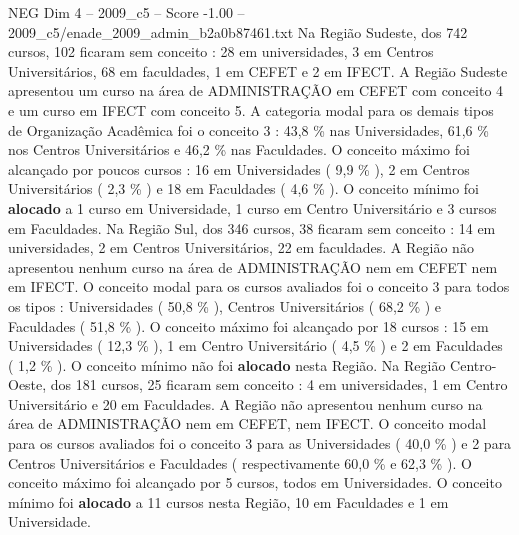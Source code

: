 \begin{textsample}{NEG Dim 4 – 2009\_c5 – Score -1.00 – 2009\_c5/enade\_2009\_admin\_b2a0b87461.txt}
Na Região Sudeste, dos 742 cursos, 102 ficaram sem conceito : 28 em universidades, 3 em Centros Universitários, 68 em faculdades, 1 em CEFET e 2 em IFECT.
A Região Sudeste apresentou um curso na área de ADMINISTRAÇÃO em CEFET com conceito 4 e um curso em IFECT com conceito 5.
A categoria modal para os demais tipos de Organização Acadêmica foi o conceito 3 : 43,8 \% nas Universidades, 61,6 \% nos Centros Universitários e 46,2 \% nas Faculdades.
O conceito máximo foi alcançado por poucos cursos : 16 em Universidades ( 9,9 \% ), 2 em Centros Universitários ( 2,3 \% ) e 18 em Faculdades ( 4,6 \% ).
O conceito mínimo foi \textbf{alocado} a 1 curso em Universidade, 1 curso em Centro Universitário e 3 cursos em Faculdades.
Na Região Sul, dos 346 cursos, 38 ficaram sem conceito : 14 em universidades, 2 em Centros Universitários, 22 em faculdades.
A Região não apresentou nenhum curso na área de ADMINISTRAÇÃO nem em CEFET nem em IFECT.
O conceito modal para os cursos avaliados foi o conceito 3 para todos os tipos : Universidades ( 50,8 \% ), Centros Universitários ( 68,2 \% ) e Faculdades ( 51,8 \% ).
O conceito máximo foi alcançado por 18 cursos : 15 em Universidades ( 12,3 \% ), 1 em Centro Universitário ( 4,5 \% ) e 2 em Faculdades ( 1,2 \% ).
O conceito mínimo não foi \textbf{alocado} nesta Região.
Na Região Centro-Oeste, dos 181 cursos, 25 ficaram sem conceito : 4 em universidades, 1 em Centro Universitário e 20 em Faculdades.
A Região não apresentou nenhum curso na área de ADMINISTRAÇÃO nem em CEFET, nem IFECT.
O conceito modal para os cursos avaliados foi o conceito 3 para as Universidades ( 40,0 \% ) e 2 para Centros Universitários e Faculdades ( respectivamente 60,0 \% e 62,3 \% ).
O conceito máximo foi alcançado por 5 cursos, todos em Universidades.
O conceito mínimo foi \textbf{alocado} a 11 cursos nesta Região, 10 em Faculdades e 1 em Universidade.

\end{textsample}
